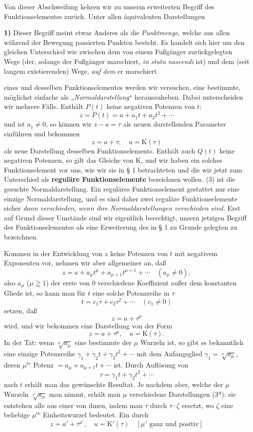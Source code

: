 \documentclass{article}
\begin{document}
Von dieser Abschweifung kehren wir zu unserm erweiterten Begriff des Funktionselementes zurück. Unter allen äquivalenten Darstellungen

\textbf{1)} Dieser Begriff meint etwas Anderes als die \emph{Punktmenge}, welche aus allen während der Bewegung passierten Punkten besteht. Es handelt sich hier um den gleichen Unterschied wie zwischen dem von einem Fußgänger zurückgelegten Wege (der, solange der Fußgänger marschiert, \emph{in statu nascendi} ist) und dem (seit langem existierenden) Wege, \emph{auf dem} er marschiert.

eines und desselben Funktionselementes werden wir versuchen, eine bestimmte, möglichst einfache als „\emph{Normaldarstellung}“ herauszuheben. Dabei unterscheiden wir mehrere Fälle. Enthält $P(t)$ keine negativen Potenzen von $t$:
\[ z = P(t) = a + a_1 t + a_2 t^2 + \cdots \]
und ist $a_1 \neq 0$, so können wir $z - a = \tau$ als neuen darstellenden Parameter einführen und bekommen
\[ z = a + \tau, \quad u = \mathrm{K}(\tau) \tag{3} \]
als neue Darstellung desselben Funktionselements. Enthält auch $Q(t)$ keine negativen Potenzen, so gilt das Gleiche von $\mathrm{K}$, und wir haben ein solches Funktionselement vor uns, wie wir sie in § 1 betrachteten und die wir jetzt zum Unterschied als \textbf{reguläre Funktionselemente} bezeichnen wollen. (3) ist die gesuchte Normaldarstellung. Ein reguläres Funktionselement gestattet nur eine einzige Normaldarstellung, und es sind daher zwei reguläre Funktionselemente sicher \emph{dann verschieden, wenn ihre Normaldarstellungen verschieden sind.} Erst auf Grund dieser Umstände sind wir eigentlich berechtigt, unsern jetzigen Begriff des Funktionselementes als eine Erweiterung des in § 1 zu Grunde gelegten zu bezeichnen.

Kommen in der Entwicklung von $z$ keine Potenzen von $t$ mit negativem Exponenten vor, nehmen wir aber allgemeiner an, daß
\[ z = a + a_\mu t^\mu + a_{\mu+1} t^{\mu+1} + \cdots \quad (a_\mu \neq 0), \]
also $a_\mu$ ($\mu \geqq 1$) der erste von $0$ verschiedene Koeffizient außer dem konstanten Gliede ist, so kann man für $t$ eine solche Potenzreihe in $\tau$
\[ t = c_1 \tau + c_2 \tau^2 + \cdots \quad (c_1 \neq 0) \]
setzen, daß
\[ z = a + \tau^\mu \]
wird, und wir bekommen eine Darstellung von der Form
\[ z = a + \tau^\mu, \quad u = \mathrm{K}(\tau). \tag{3*} \]
In der Tat: wenn $\sqrt[\mu]{a_\mu}$ eine bestimmte der $\mu$ Wurzeln ist, so gibt es bekanntlich eine einzige Potenzreihe $\gamma_1 + \gamma_2 t + \gamma_3 t^2 + \cdots$ mit dem Anfangsglied $\gamma_1 = \sqrt[\mu]{a_\mu}$, deren $\mu^{\text{te}}$ Potenz $= a_\mu + a_{\mu+1} t + \cdots$ ist. Durch Auflösung von
\[ \tau = \gamma_1 t + \gamma_2 t^2 + \cdots \]
nach $t$ erhält man das gewünschte Resultat. Je nachdem aber, welche der $\mu$ Wurzeln $\sqrt[\mu]{a_\mu}$ man nimmt, erhält man $\mu$ verschiedene Darstellungen (3*): sie entstehen alle aus einer von ihnen, indem man $\tau$ durch $\tau \cdot \zeta$ ersetzt, wo $\zeta$ eine beliebige $\mu^{\text{te}}$ Einheitswurzel bedeutet. Ein durch
\[ z = a' + \tau^{\mu'}, \quad u = \mathrm{K}'(\tau) \quad [\mu' \text{ ganz und positiv}] \tag{4} \]
\end{document}
